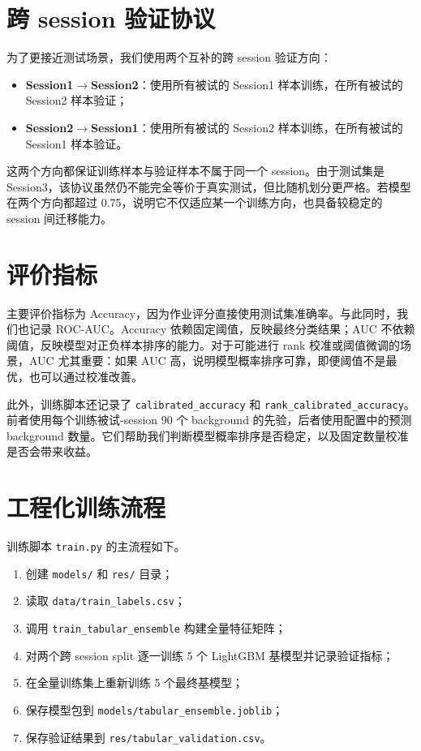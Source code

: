 \section{跨 session 验证协议}

为了更接近测试场景，我们使用两个互补的跨 session 验证方向：

\begin{itemize}
  \item \textbf{Session1$\rightarrow$Session2}：使用所有被试的 Session1 样本训练，在所有被试的 Session2 样本验证；
  \item \textbf{Session2$\rightarrow$Session1}：使用所有被试的 Session2 样本训练，在所有被试的 Session1 样本验证。
\end{itemize}

这两个方向都保证训练样本与验证样本不属于同一个 session。由于测试集是 Session3，该协议虽然仍不能完全等价于真实测试，但比随机划分更严格。若模型在两个方向都超过 0.75，说明它不仅适应某一个训练方向，也具备较稳定的 session 间迁移能力。

\section{评价指标}

主要评价指标为 Accuracy，因为作业评分直接使用测试集准确率。与此同时，我们也记录 ROC-AUC。Accuracy 依赖固定阈值，反映最终分类结果；AUC 不依赖阈值，反映模型对正负样本排序的能力。对于可能进行 rank 校准或阈值微调的场景，AUC 尤其重要：如果 AUC 高，说明模型概率排序可靠，即便阈值不是最优，也可以通过校准改善。

此外，训练脚本还记录了 \texttt{calibrated\_accuracy} 和 \texttt{rank\_calibrated\_accuracy}。前者使用每个训练被试-session 90 个 background 的先验，后者使用配置中的预测 background 数量。它们帮助我们判断模型概率排序是否稳定，以及固定数量校准是否会带来收益。

\section{工程化训练流程}

训练脚本 \texttt{train.py} 的主流程如下。

\begin{enumerate}
  \item 创建 \texttt{models/} 和 \texttt{res/} 目录；
  \item 读取 \texttt{data/train\_labels.csv}；
  \item 调用 \texttt{train\_tabular\_ensemble} 构建全量特征矩阵；
  \item 对两个跨 session split 逐一训练 5 个 LightGBM 基模型并记录验证指标；
  \item 在全量训练集上重新训练 5 个最终基模型；
  \item 保存模型包到 \texttt{models/tabular\_ensemble.joblib}；
  \item 保存验证结果到 \texttt{res/tabular\_validation.csv}。
\end{enumerate}

